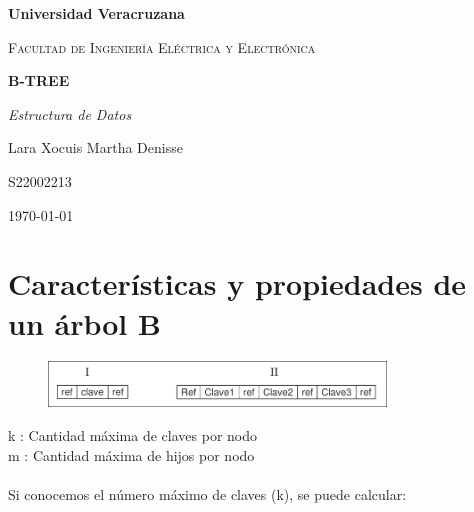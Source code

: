 \documentclass[letterpaper,12pt]{article}
\begin{document}
\thispagestyle{empty}
\newpage
\setcounter{page}{1}
\pagestyle{headings}
\begin{sloppypar} 
\begin{titlepage}
    \hspace{2.5cm}
    {\bfseries\LARGE Universidad Veracruzana \par}
    \hspace{2cm}
    {\scshape\Large Facultad de Ingeniería Eléctrica y Electrónica \par}
    \begin{center}
        \vfill
        {\Huge \textbf{B-TREE}} \\ 
        {\itshape\Large Estructura de Datos \par}
        {\large Lara Xocuis Martha Denisse \par}
        {\large S22002213 \par}
        \vfill
        {\Large \today \par}
    \end{center}
    
\end{titlepage} 

\section{Características y propiedades de un árbol B}
\begin{figure}[H]
    \centering
    \includegraphics[width=0.8\textwidth]{b.png}
\end{figure}
k : Cantidad máxima de claves por nodo \\ 
m : Cantidad máxima de hijos por nodo \\ 
\vspace{0.3cm}\\ 
Si conocemos el número máximo de claves (k), se puede calcular:




\end{sloppypar}
\end{document}
